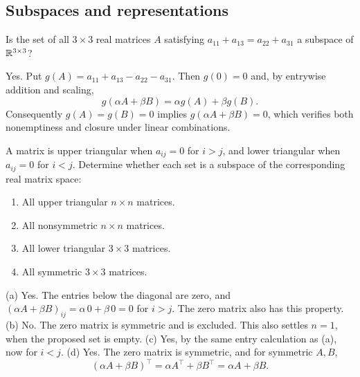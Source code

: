 \subsection*{Subspaces and representations}
\begin{problem}\label{ex:02:bapat-1-8}
Is the set of all $3\times3$ real matrices $A$ satisfying
$a_{11}+a_{13}=a_{22}+a_{31}$ a subspace of $\mathbb R^{3\times3}$?
\end{problem}
\begin{solution}
Yes. Put $g(A)=a_{11}+a_{13}-a_{22}-a_{31}$.
Then $g(0)=0$ and, by entrywise addition and scaling,
\[
g(\alpha A+\beta B)=\alpha g(A)+\beta g(B).
\]
Consequently $g(A)=g(B)=0$ implies $g(\alpha A+\beta B)=0$, which verifies
both nonemptiness and closure under linear combinations.
\end{solution}

\begin{problem}\label{ex:02:matrix-subspaces}
A matrix is upper triangular when \(a_{ij}=0\) for \(i>j\), and
lower triangular when \(a_{ij}=0\) for \(i<j\).
Determine whether each set is a subspace of the corresponding real matrix space:
\begin{enumerate}
\item All upper triangular $n\times n$ matrices.
\item All nonsymmetric $n\times n$ matrices.
\item All lower triangular $3\times3$ matrices.
\item All symmetric $3\times3$ matrices.
\end{enumerate}
\end{problem}
\begin{solution}
(a) Yes. The entries below the diagonal are zero, and
$(\alpha A+\beta B)_{ij}=\alpha\,0+\beta\,0=0$ for $i>j$.
The zero matrix also has this property.
(b) No. The zero matrix is symmetric and is excluded.
This also settles $n=1$, when the proposed set is empty.
(c) Yes, by the same entry calculation as (a), now for $i<j$.
(d) Yes. The zero matrix is symmetric, and for symmetric $A,B$,
\[
(\alpha A+\beta B)^\top=\alpha A^\top+\beta B^\top=\alpha A+\beta B.
\]
\end{solution}

